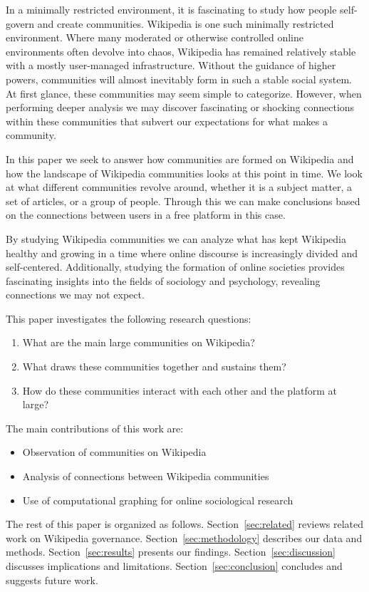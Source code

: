 
In a minimally restricted environment, it is fascinating to study how people self-govern and create communities. Wikipedia is one such minimally restricted environment. Where many moderated or otherwise controlled online environments often devolve into chaos, Wikipedia has remained relatively stable with a mostly user-managed infrastructure. Without the guidance of higher powers, communities will almost inevitably form in such a stable social system. At first glance, these communities may seem simple to categorize. However, when performing deeper analysis we may discover fascinating or shocking connections within these communities that subvert our expectations for what makes a community.

In this paper we seek to answer how communities are formed on Wikipedia and how the landscape of Wikipedia communities looks at this point in time. We look at what different communities revolve around, whether it is a subject matter, a set of articles, or a group of people. Through this we can make conclusions based on the connections between users in a free platform in this case.

By studying Wikipedia communities we can analyze what has kept Wikipedia healthy and growing in a time where online discourse is increasingly divided and self-centered. Additionally, studying the formation of online societies provides fascinating insights into the fields of sociology and psychology, revealing connections we may not expect.

This paper investigates the following research questions:
\begin{enumerate}
    \item What are the main large communities on Wikipedia?
    \item What draws these communities together and sustains them?
    \item How do these communities interact with each other and the platform at large?
\end{enumerate}

The main contributions of this work are:
\begin{itemize}
    \item Observation of communities on Wikipedia
    \item Analysis of connections between Wikipedia communities
    \item Use of computational graphing for online sociological research 
\end{itemize}

The rest of this paper is organized as follows. 
Section~\ref{sec:related} reviews related work on Wikipedia governance. 
Section~\ref{sec:methodology} describes our data and methods.
Section~\ref{sec:results} presents our findings.
Section~\ref{sec:discussion} discusses implications and limitations.
Section~\ref{sec:conclusion} concludes and suggests future work.

